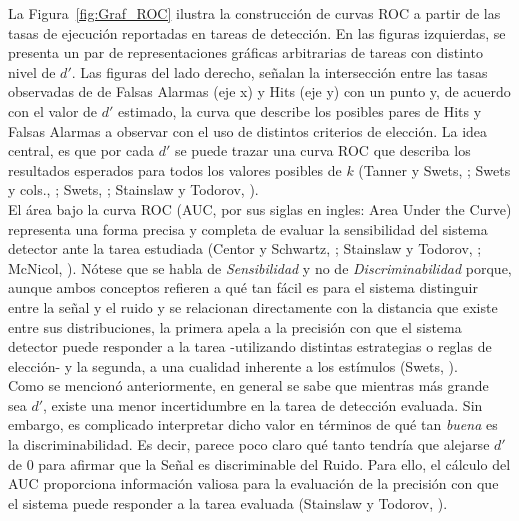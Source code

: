 La Figura~\ref{fig:Graf_ROC} ilustra la construcción de curvas ROC a partir de las tasas de ejecución reportadas en tareas de detección. En las figuras izquierdas, se presenta un par de representaciones gráficas arbitrarias de tareas con distinto nivel de $d'$. Las figuras del lado derecho, señalan la intersección entre las tasas observadas de de Falsas Alarmas (eje x) y Hits (eje y) con un punto y, de acuerdo con el valor de $d'$ estimado, la curva que describe los posibles pares de Hits y Falsas Alarmas a observar con el uso de distintos criterios de elección. La idea central, es que por cada $d'$ se puede trazar una curva ROC que describa los resultados esperados para todos los valores posibles de $k$ (Tanner y Swets, \citeyear{Tanner1954}; Swets y cols.,  \citeyear{Swets1961}; Swets, \citeyear{Swets1973}; Stainslaw y Todorov, \citeyear{Stainslaw1999}).\\


El área bajo la curva ROC (AUC, por sus siglas en ingles: Area Under the Curve) representa una forma precisa y completa de evaluar la sensibilidad del sistema detector ante la tarea estudiada (Centor y Schwartz, \citeyear{Centor1985}; Stainslaw y Todorov, \citeyear{Stainslaw1999}; McNicol, \citeyear{McNicol5}). Nótese que se habla de \textit{Sensibilidad} y no de \textit{Discriminabilidad} porque, aunque ambos conceptos refieren a qué tan fácil es para el sistema distinguir entre la señal y el ruido y se relacionan directamente con la distancia que existe entre sus distribuciones, la primera apela a la precisión con que el sistema detector puede responder a la tarea -utilizando distintas estrategias o reglas de elección- y la segunda, a una cualidad inherente a los estímulos (Swets, \citeyear{Swets1973}).\\

Como se mencionó anteriormente, en general se sabe que mientras más grande sea $d'$, existe una menor incertidumbre en la tarea de detección evaluada. Sin embargo, es complicado interpretar dicho valor en términos de qué tan \textit{buena} es la discriminabilidad. Es decir, parece poco claro qué tanto tendría que alejarse $d'$ de $0$ para afirmar que la Señal es discriminable del Ruido. Para ello, el cálculo del AUC proporciona información valiosa para la evaluación de la precisión con que el sistema puede responder a la tarea evaluada (Stainslaw y Todorov, \citeyear{Stainslaw1999}).\\ 

